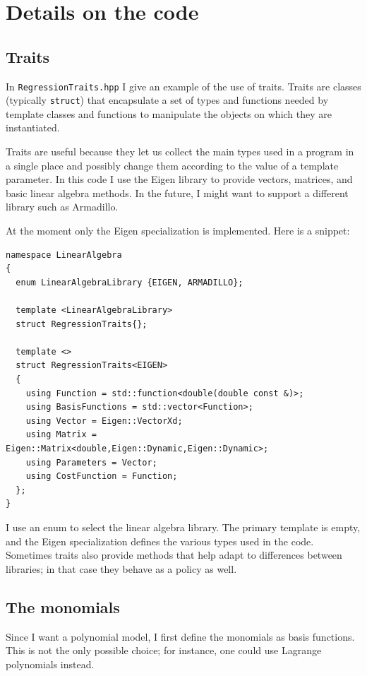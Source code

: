 \documentclass{article}
\newcommand{\li}{\lstinline}
\begin{document}
\section{Details on the code}
\subsection{Traits}
In \texttt{RegressionTraits.hpp} I give an example of the use of traits. Traits are classes (typically \li!struct!) that encapsulate a set of types and functions needed by template classes and functions to manipulate the objects on which they are instantiated.

Traits are useful because they let us collect the main types used in a program in a single place and possibly change them according to the value of a template parameter. In this code I use the Eigen library to provide vectors, matrices, and basic linear algebra methods. In the future, I might want to support a different library such as Armadillo.

At the moment only the Eigen specialization is implemented. Here is a snippet:
\begin{lstlisting}[title={RegressionTraits.hpp}]
namespace LinearAlgebra
{
  enum LinearAlgebraLibrary {EIGEN, ARMADILLO};

  template <LinearAlgebraLibrary>
  struct RegressionTraits{};

  template <>
  struct RegressionTraits<EIGEN>
  {
    using Function = std::function<double(double const &)>;
    using BasisFunctions = std::vector<Function>;
    using Vector = Eigen::VectorXd;
    using Matrix = Eigen::Matrix<double,Eigen::Dynamic,Eigen::Dynamic>;
    using Parameters = Vector;
    using CostFunction = Function;
  };
}
\end{lstlisting}

I use an enum to select the linear algebra library. The primary template is empty, and the Eigen specialization defines the various types used in the code. Sometimes traits also provide methods that help adapt to differences between libraries; in that case they behave as a policy as well.

\subsection{The monomials}
Since I want a polynomial model, I first define the monomials as basis functions. This is not the only possible choice; for instance, one could use Lagrange polynomials instead.
\end{document}
